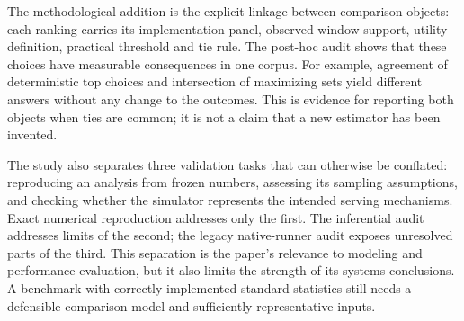 The methodological addition is the explicit linkage between comparison
objects: each ranking carries its implementation panel, observed-window
support, utility definition, practical threshold and tie rule. The
post-hoc audit shows that these choices have measurable consequences in
one corpus. For example, agreement of deterministic top choices and
intersection of maximizing sets yield different answers without any change
to the outcomes. This is evidence for reporting both objects when ties
are common; it is not a claim that a new estimator has been invented.

The study also separates three validation tasks that can otherwise be
conflated: reproducing an analysis from frozen numbers, assessing its
sampling assumptions, and checking whether the simulator represents the
intended serving mechanisms. Exact numerical reproduction addresses only
the first. The inferential audit addresses limits of the second; the
legacy native-runner audit exposes unresolved parts of the third. This
separation is the paper's relevance to modeling and performance evaluation,
but it also limits the strength of its systems conclusions. A benchmark
with correctly implemented standard statistics still needs a defensible
comparison model and sufficiently representative inputs.
